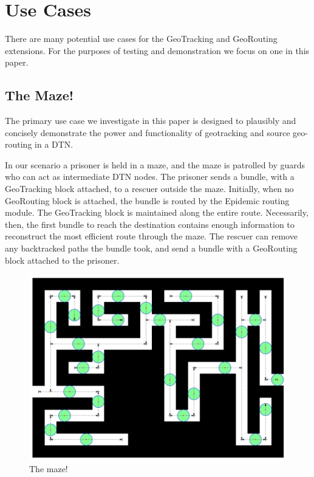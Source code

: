%
%
\section{Use Cases}

There are many potential use cases for the GeoTracking and GeoRouting extensions.  For the purposes of testing and demonstration we focus on one in this paper.

\subsection{The Maze!}

The primary use case we investigate in this paper is designed to plausibly and concisely demonstrate the power and functionality of geotracking and source geo-routing in a DTN.

In our scenario a prisoner is held in a maze, and the maze is patrolled by guards who can act as intermediate DTN nodes.  The prisoner sends a bundle, with a GeoTracking block attached, to a rescuer outside the maze.  Initially, when no GeoRouting block is attached, the bundle is routed by the Epidemic routing module.  The GeoTracking block is maintained along the entire route.  Necessarily, then, the first bundle to reach the destination contains enough information to reconstruct the most efficient route through the maze.  The rescuer can remove any backtracked paths the bundle took, and send a bundle with a GeoRouting block attached to the prisoner.

\begin{figure}
\begin{center}
\includegraphics[width=.9\columnwidth]{figures/maze_diagram.pdf}
\end{center}
\caption{The maze!}
\label{fig:maze}
\end{figure}

